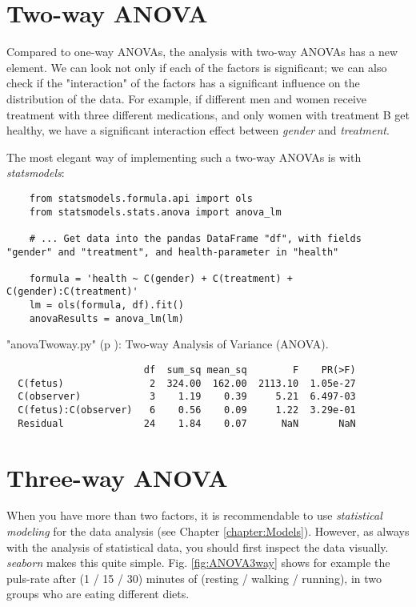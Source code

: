 \section{Two-way ANOVA} \label{sec:anovaTwoWay}  

Compared to one-way ANOVAs, the analysis with two-way ANOVAs has a new element. We can look not only if each of the factors is significant; we can also check if the "interaction" of the factors has a significant influence on the distribution of the data. For example, if different men and women receive treatment with three different medications, and only women with treatment B get healthy, we have a significant interaction effect between \emph{gender} and \emph{treatment}.

The most elegant way of implementing such a two-way ANOVAs is with \emph{statsmodels}:

\begin{lstlisting}
    from statsmodels.formula.api import ols
    from statsmodels.stats.anova import anova_lm

    # ... Get data into the pandas DataFrame "df", with fields "gender" and "treatment", and health-parameter in "health"

    formula = 'health ~ C(gender) + C(treatment) + C(gender):C(treatment)'
    lm = ols(formula, df).fit()
    anovaResults = anova_lm(lm)
\end{lstlisting}

\PyImg "anovaTwoway.py" (p \pageref{py:anovaTwoway}): Two-way Analysis of Variance (ANOVA).

\begin{verbatim}
                        df  sum_sq mean_sq        F    PR(>F)
  C(fetus)               2  324.00  162.00  2113.10  1.05e-27
  C(observer)            3    1.19    0.39     5.21  6.497-03
  C(fetus):C(observer)   6    0.56    0.09     1.22  3.29e-01
  Residual              24    1.84    0.07      NaN       NaN
\end{verbatim}

\section{Three-way ANOVA} \label{sec:anovaThreeWay} 

When you have more than two factors, it is recommendable to use \emph{statistical modeling} for the data analysis (see Chapter \ref{chapter:Models}). However, as always with the analysis of statistical data, you should first inspect the data visually. \emph{seaborn} makes this quite simple. Fig. \ref{fig:ANOVA3way} shows for example the puls-rate after (1 / 15 / 30) minutes of (resting / walking / running), in two groups who are eating different diets.

